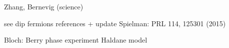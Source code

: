 \cite{Willett1987}

\cite{Haldane1988}

\cite{Kitaev2003}

\cite{Kane2005a,Kane2005,Hasan2010}

Zhang, Bernevig (science)



see dip fermions references + update
Spielman: PRL 114, 125301 (2015)

\cite{Aidelsburger2011,Aidelsburger2013,Miyake2013}

Bloch: Berry phase experiment
Haldane model \cite{Jotzu2014}




